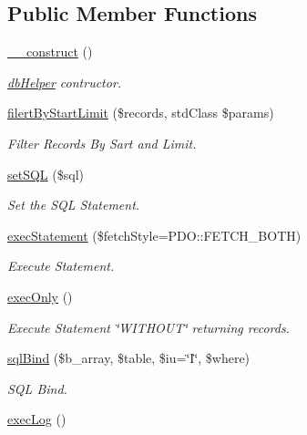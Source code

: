 \subsection*{\-Public \-Member \-Functions}
\begin{DoxyCompactItemize}
\item 
\hyperlink{classdb_helper_a095c5d389db211932136b53f25f39685}{\-\_\-\-\_\-construct} ()
\begin{DoxyCompactList}\small\item\em \hyperlink{classdb_helper}{db\-Helper} contructor. \end{DoxyCompactList}\item 
\hyperlink{classdb_helper_a3ca2578f15860418ca93fca0112a0e08}{filert\-By\-Start\-Limit} (\$records, std\-Class \$params)
\begin{DoxyCompactList}\small\item\em \-Filter \-Records \-By \-Sart and \-Limit. \end{DoxyCompactList}\item 
\hyperlink{classdb_helper_a21e387f778abae898a33b0355e56c095}{set\-S\-Q\-L} (\$sql)
\begin{DoxyCompactList}\small\item\em \-Set the \-S\-Q\-L \-Statement. \end{DoxyCompactList}\item 
\hyperlink{classdb_helper_a43a2fa1fe095e37df5a641fe1cfc7d9c}{exec\-Statement} (\$fetch\-Style=\-P\-D\-O\-::\-F\-E\-T\-C\-H\-\_\-\-B\-O\-T\-H)
\begin{DoxyCompactList}\small\item\em \-Execute \-Statement. \end{DoxyCompactList}\item 
\hyperlink{classdb_helper_ae033db35138ae80f3b1fd33c5c2c473e}{exec\-Only} ()
\begin{DoxyCompactList}\small\item\em \-Execute \-Statement \char`\"{}\-W\-I\-T\-H\-O\-U\-T\char`\"{} returning records. \end{DoxyCompactList}\item 
\hyperlink{classdb_helper_aa9840bbfb81d2d519994cd0a8e880c4a}{sql\-Bind} (\$b\-\_\-array, \$table, \$iu=\char`\"{}\-I\char`\"{}, \$where)
\begin{DoxyCompactList}\small\item\em \-S\-Q\-L \-Bind. \end{DoxyCompactList}\item 
\hyperlink{classdb_helper_a75dea4073687142b0b1b6a6819cbb243}{exec\-Log} ()

\end{DoxyCompactItemize}
